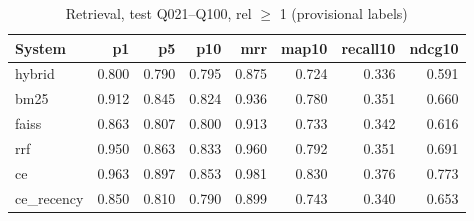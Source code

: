 \begin{table}[t]
\centering
\caption{Retrieval, test Q021--Q100, rel $\geq$ 1 (provisional labels)}
\label{tab:retrieval}
\begin{tabular}{lrrrrrrr}
\toprule
System & p1 & p5 & p10 & mrr & map10 & recall10 & ndcg10 \\
\midrule
hybrid & 0.800 & 0.790 & 0.795 & 0.875 & 0.724 & 0.336 & 0.591 \\
bm25 & 0.912 & 0.845 & 0.824 & 0.936 & 0.780 & 0.351 & 0.660 \\
faiss & 0.863 & 0.807 & 0.800 & 0.913 & 0.733 & 0.342 & 0.616 \\
rrf & 0.950 & 0.863 & 0.833 & 0.960 & 0.792 & 0.351 & 0.691 \\
ce & 0.963 & 0.897 & 0.853 & 0.981 & 0.830 & 0.376 & 0.773 \\
ce\_recency & 0.850 & 0.810 & 0.790 & 0.899 & 0.743 & 0.340 & 0.653 \\
\bottomrule
\end{tabular}
\end{table}
